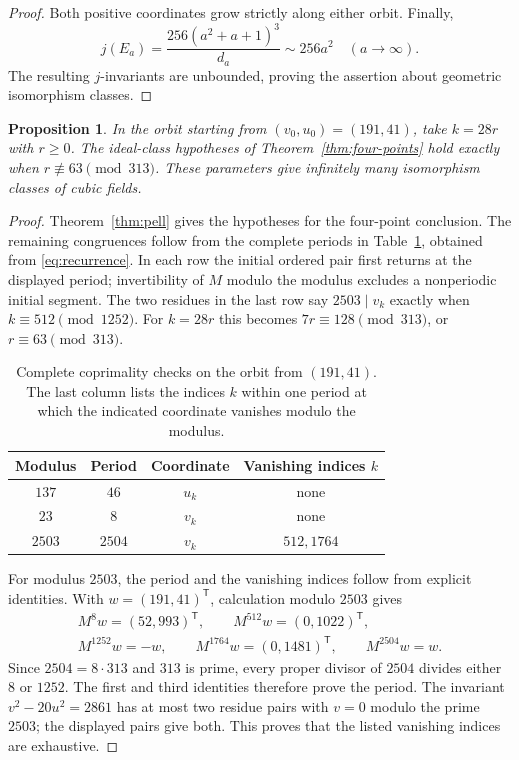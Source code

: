 \documentclass[draft]{publmathdeb}
\newtheorem{proposition}[theorem]{Proposition}
\theoremstyle{remark}
\numberwithin{equation}{section}
\begin{document}
\begin{proof}
  Both positive coordinates grow strictly along either orbit. Finally,
  \[
    j(E_a)=\frac{256(a^2+a+1)^3}{d_a}\sim256a^2
    \quad(a\longrightarrow\infty).
  \]
  The resulting $j$-invariants are unbounded, proving the assertion about geometric isomorphism classes.
\end{proof}

\begin{proposition}\label{prop:subsequence}
  In the orbit starting from $(v_0,u_0)=(191,41)$, take $k=28r$ with $r\geq0$. The ideal-class hypotheses of Theorem~\ref{thm:four-points} hold exactly when $r\not\equiv63\pmod{313}$. These parameters give infinitely many isomorphism classes of cubic fields.
\end{proposition}

\begin{proof}
  Theorem~\ref{thm:pell} gives the hypotheses for the four-point conclusion. The remaining congruences follow from the complete periods in Table~\ref{tab:coprime}, obtained from \eqref{eq:recurrence}. In each row the initial ordered pair first returns at the displayed period; invertibility of $M$ modulo the modulus excludes a nonperiodic initial segment. The two residues in the last row say $2503\mid v_k$ exactly when $k\equiv512\pmod{1252}$. For $k=28r$ this becomes $7r\equiv128\pmod{313}$, or $r\equiv63\pmod{313}$.

  \begin{table}[ht]
    \centering

    \begin{tabular}{cccc}
      \toprule
      Modulus & Period & Coordinate & Vanishing indices $k$ \\
      \midrule
      $137$   & $46$   & $u_k$      & none                  \\
      $23$    & $8$    & $v_k$      & none                  \\
      $2503$  & $2504$ & $v_k$      & $512,1764$            \\
      \bottomrule
    \end{tabular}
    \caption{Complete coprimality checks on the orbit from $(191,41)$. The last column lists the indices $k$ within one period at which the indicated coordinate vanishes modulo the modulus.}
    \label{tab:coprime}
  \end{table}

  For modulus $2503$, the period and the vanishing indices follow from explicit identities. With $w=(191,41)^{\mathsf T}$, calculation modulo $2503$ gives
  \begin{gather*}
    M^8w=(52,993)^{\mathsf T},\qquad M^{512}w=(0,1022)^{\mathsf T},\\
    M^{1252}w=-w,\qquad M^{1764}w=(0,1481)^{\mathsf T},\qquad M^{2504}w=w.
  \end{gather*}
  Since $2504=8\cdot313$ and $313$ is prime, every proper divisor of $2504$ divides either $8$ or $1252$. The first and third identities therefore prove the period. The invariant $v^2-20u^2=2861$ has at most two residue pairs with $v=0$ modulo the prime $2503$; the displayed pairs give both. This proves that the listed vanishing indices are exhaustive.


\end{proof}
\end{document}
